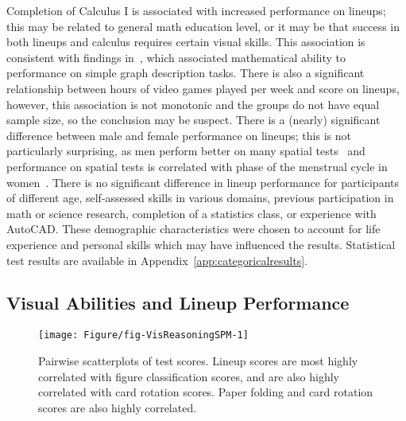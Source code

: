 \documentclass[journal]{vgtc}\usepackage[]{graphicx}\usepackage[]{color}
\begin{document}
Completion of Calculus I is associated with increased performance on lineups; this may be related to general math education level, or it may be that success in both lineups and calculus requires certain visual skills. This association is consistent with findings in~\cite{shah1995conceptual}, which associated  mathematical ability to performance on simple graph description tasks.  There is also a significant relationship between hours of video games played per week and score on lineups, however, this association is not monotonic and the groups do not have equal sample size, so the conclusion may be suspect. There is a (nearly) significant difference between male and female performance on lineups; this is not particularly surprising, as men perform better on many spatial tests~\cite{voyer1995magnitude} and performance on spatial tests is correlated with phase of the menstrual cycle in women~\cite{hausmann2000sex}. There is no significant difference in lineup performance for participants of different age, self-assessed skills in various domains, previous participation in math or science research, completion of a statistics class, or experience with AutoCAD. These demographic characteristics were chosen to account for life experience and personal skills which may have influenced the results. Statistical test results are available in Appendix~\ref{app:categoricalresults}. 

\subsection{Visual Abilities and Lineup Performance}



\begin{figure}[ht]
\centering
\texttt{[image: Figure/fig-VisReasoningSPM-1]}
\caption{Pairwise scatterplots of test scores. Lineup scores are most highly correlated with figure classification scores, and are also highly correlated with card rotation scores. Paper folding and card rotation scores are also highly correlated.\label{fig:scatterplotmatrix}}
\end{figure}
\end{document}

